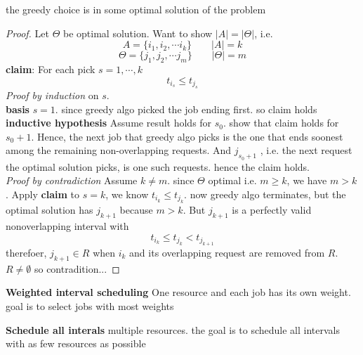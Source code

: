 \documentclass[11pt]{article}
\begin{document}
\begin{example}
\begin{solution}
    \begin{proposition*}
      the greedy choice is in some optimal solution of the problem
    \end{proposition*}
    \begin{proof}
      Let $\Theta$ be optimal solution. Want to show $|A| = |\Theta|$, i.e.
      \[
        A = \{ i_1, i_2, \cdots i_k\} \quad \quad |A| = k
      \]
      \[
        \Theta = \{ j_1, j_2, \cdots j_m\} \quad \quad |\Theta| = m
      \]
      \textbf{claim}: For each pick $s = 1, \cdots, k$
      \[
        t_{i_s} \leq t_{j_s}
      \]
      \textit{Proof by induction} on $s$.\\ \textbf{basis} $s=1$. since greedy algo picked the job ending first. so claim holds\\ \textbf{inductive hypothesis} Assume result holds for $s_0$. show that claim holds for $s_0 + 1$. Hence, the next job that greedy algo picks is the one that ends soonest among the remaining non-overlapping requests. And $j_{s_0+1}$ , i.e. the next request the optimal solution picks, is one such requests. hence the claim holds. \\
      \textit{Proof by contradiction} Assume $k\neq m$. since $\Theta$ optimal i.e. $m \geq k$, we have $m>k$. Apply \textbf{claim} to $s=k$, we know $t_{i_k} \leq t_{j_k}$. now greedy algo terminates, but the optimal solution has $j_{k+1}$ because $m>k$. But $j_{k+1}$ is a perfectly valid nonoverlapping interval with
      \[
        t_{i_{k}} \leq t_{j_{k}} < t_{j_{k+1}}
      \]
      therefoer, $j_{k+1}\in R$ when $i_k$ and its overlapping request are removed from $R$. $R\neq \emptyset$ so contradition...
    \end{proof}
  \end{solution}
\end{example}


\begin{example}
  \textbf{Weighted interval scheduling} One resource and each job has its own weight. goal is to select jobs with most weights\\
\end{example}

\begin{example}
  \textbf{Schedule all interals} multiple resources. the goal is to schedule all intervals with as few resources as possible
\end{example}
\end{document}
